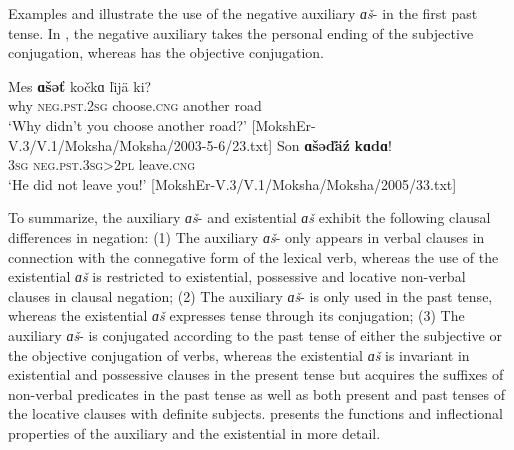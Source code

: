 \documentclass[output=paper]{langsci/langscibook}
\begin{document}
  Examples  and  illustrate the use of the negative auxiliary \textit{ɑš}- in the first past tense. In , the negative auxiliary takes the personal ending of the subjective conjugation, whereas  has the objective conjugation.

\ea\label{ex:moksha-road}
\gll Mes \textbf{ɑšəť} kočkɑ ľijä ki?\\
why \textsc{neg.pst.2sg} choose.\textsc{cng} another road\\
\glt `Why didn't you choose another road?' [MokshEr-V.3/V.1/Moksha/Moksha/2003-5-6/23.txt]
\z
\ea\label{ex:moksha-leave}
\gll Son \textbf{ɑšəďäź} \textbf{kɑdɑ}!\\
\textsc{3sg} \textsc{neg.pst.3sg>2pl} leave.\textsc{cng}\\
\glt `He did not leave you!' [MokshEr-V.3/V.1/Moksha/Moksha/2005/33.txt]
\z

  To summarize, the auxiliary \textit{ɑš}- and existential \textit{ɑš} exhibit the following clausal differences in negation: (1) The auxiliary \textit{ɑš}- only appears in verbal clauses in connection with the connegative form of the lexical verb, whereas the use of the existential \textit{ɑš} is restricted to existential, possessive and locative non-verbal clauses in clausal negation; (2) The auxiliary \textit{ɑš}- is only used in the past tense, whereas the existential \textit{ɑš} expresses tense through its conjugation; (3) The auxiliary \textit{ɑš}- is conjugated according to the past tense of either the subjective or the objective conjugation of verbs, whereas the existential \textit{ɑš} is invariant in existential and possessive clauses in the present tense but acquires the suffixes of non-verbal predicates in the past tense as well as both present and past tenses of the locative clauses with definite subjects.  presents the functions and inflectional properties of the auxiliary and the existential in more detail.
\end{document}
